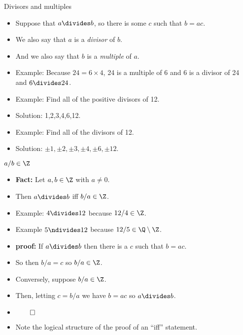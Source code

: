 \documentclass{beamer}
\begin{document}
\begin{frame}{Divisors and multiples}

\begin{itemize}
  \item Suppose that $a\divides b$, so there is some $c$ such that $b = ac$.
  \item We also say that $a$ is a \emph{divisor} of $b$.
  \item And we also say that $b$ is a \emph{multiple} of $a$.
  \item Example: Because $24 = 6 \times 4$, 24 is a multiple of 6 and 6 is
  a divisor of 24 and $6\divides 24$.
  \item Example: Find all of the positive divisors of 12.
  \item Solution: 1,2,3,4,6,12.
  \item Example: Find all of the divisors of 12.
  \item Solution: $\pm 1, \pm 2, \pm 3, \pm 4, \pm 6, \pm 12$.
\end{itemize}

\end{frame}

\begin{frame}{$a/b \in \Z$}

\begin{itemize}
  \item \textbf{Fact:} Let $a,b\in\Z$ with $a\not=0$.
  \item Then $a\divides b$ iff $b / a \in \Z$.
  \item Example: $4 \divides 12$ because $12/4 \in \Z$.
  \item Example $5 \ndivides 12$ because $12/5 \in \Q \setminus \Z$.
  \item \textbf{proof:} If $a\divides b$ then there is a $c$ such that
  $b = ac$.
  \item So then $b / a = c$ so $b/a \in \Z$.
  \item Conversely, suppose $b/a \in \Z$.
  \item Then, letting $c = b/a$ we have $b = a c$ so $a\divides b$.
  \item $\qed$
  \item Note the logical structure of the proof of an ``iff'' statement.
\end{itemize}

\end{frame}
\end{document}
